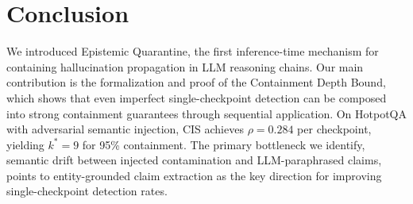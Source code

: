 \documentclass[11pt,a4paper]{article}
\begin{document}
\section{Conclusion}

We introduced Epistemic Quarantine, the first inference-time mechanism for containing hallucination propagation in LLM reasoning chains. Our main contribution is the formalization and proof of the Containment Depth Bound, which shows that even imperfect single-checkpoint detection can be composed into strong containment guarantees through sequential application. On HotpotQA with adversarial semantic injection, CIS achieves $\rho = 0.284$ per checkpoint, yielding $k^* = 9$ for 95\% containment. The primary bottleneck we identify, semantic drift between injected contamination and LLM-paraphrased claims, points to entity-grounded claim extraction as the key direction for improving single-checkpoint detection rates.
\end{document}
